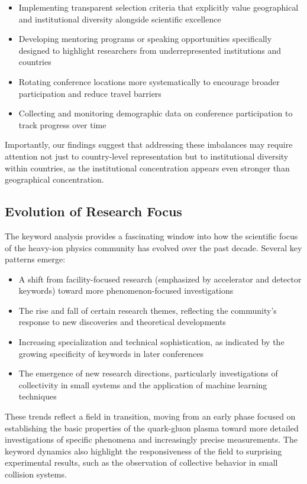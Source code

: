 \documentclass[a4paper,11pt]{article}
\begin{document}
\begin{itemize}
    \item Implementing transparent selection criteria that explicitly value geographical and institutional diversity alongside scientific excellence
    \item Developing mentoring programs or speaking opportunities specifically designed to highlight researchers from underrepresented institutions and countries
    \item Rotating conference locations more systematically to encourage broader participation and reduce travel barriers
    \item Collecting and monitoring demographic data on conference participation to track progress over time
\end{itemize}

Importantly, our findings suggest that addressing these imbalances may require attention not just to country-level representation but to institutional diversity within countries, as the institutional concentration appears even stronger than geographical concentration.

\subsection{Evolution of Research Focus}

The keyword analysis provides a fascinating window into how the scientific focus of the heavy-ion physics community has evolved over the past decade. Several key patterns emerge:

\begin{itemize}
    \item A shift from facility-focused research (emphasized by accelerator and detector keywords) toward more phenomenon-focused investigations
    \item The rise and fall of certain research themes, reflecting the community's response to new discoveries and theoretical developments
    \item Increasing specialization and technical sophistication, as indicated by the growing specificity of keywords in later conferences
    \item The emergence of new research directions, particularly investigations of collectivity in small systems and the application of machine learning techniques
\end{itemize}

These trends reflect a field in transition, moving from an early phase focused on establishing the basic properties of the quark-gluon plasma toward more detailed investigations of specific phenomena and increasingly precise measurements. The keyword dynamics also highlight the responsiveness of the field to surprising experimental results, such as the observation of collective behavior in small collision systems.
\end{document}
